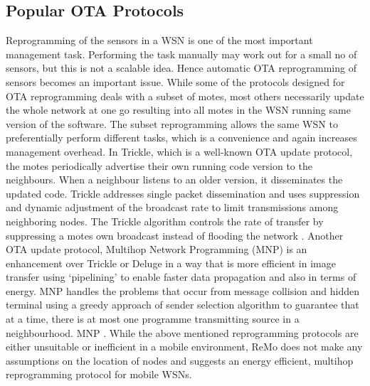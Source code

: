 \documentclass[conference,final]{IEEEtran}
\begin{document}
\subsection{Popular OTA Protocols}
Reprogramming of the sensors in a WSN is one of the most important management task.
Performing the task manually may work out for a small no of sensors, but this is not a scalable idea.
Hence automatic OTA reprogramming of sensors becomes an important issue.
While some of the protocols designed for OTA reprogramming deals with a subset of motes, most others necessarily update the whole network at one go resulting into all motes in the WSN running same version of the software.
The subset reprogramming allows the same WSN to preferentially perform different tasks, which is a convenience and again increases management overhead.
In Trickle, which is a well-known OTA update protocol, the motes periodically advertise their own running code version to the neighbours. 
When a neighbour listens to an older version, it disseminates the updated code. 
Trickle addresses single packet dissemination and uses suppression and dynamic adjustment of the broadcast rate to limit transmissions among neighboring nodes.
The Trickle algorithm controls the rate of transfer by suppressing a motes own broadcast  instead of flooding the network \cite{ISI:000221664800002}. %
Another OTA update protocol, Multihop Network Programming (MNP) is an enhancement over Trickle or Deluge in a way that is more efficient in image transfer using `pipelining' to enable faster data propagation and also in terms of energy.
MNP handles the problems that occur from message collision and hidden terminal using a greedy approach of sender selection algorithm to guarantee that at a time, there is at most one programme transmitting source  in a neighbourhood. 
MNP  \cite{Kulkarni:2005:MMN:1068511.1069352}.
While the above mentioned reprogramming protocols  are either unsuitable or inefficient in a mobile environment, ReMo does not make any assumptions on the location of nodes and suggests an energy efficient, multihop reprogramming protocol for mobile WSNs.
\end{document}
